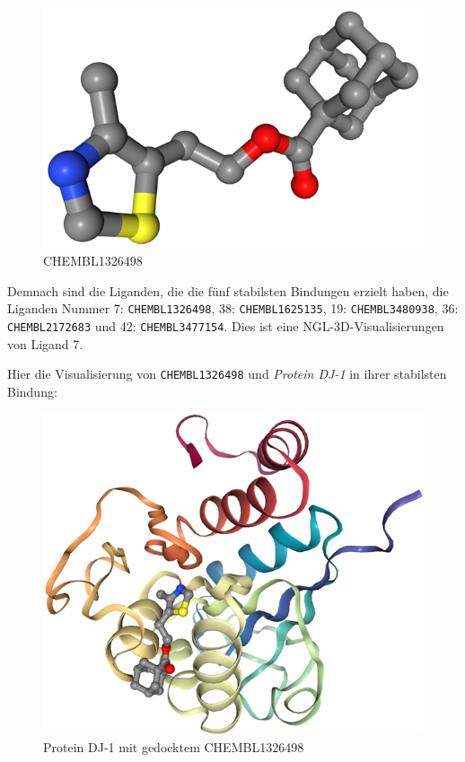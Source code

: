 \documentclass[10pt]{article}
\begin{document}
    \begin{figure}
        \includegraphics[width=\linewidth]{CHEMBL1326498}
        \caption{CHEMBL1326498}\label{fig:figure-CHEMBL1326498}
    \end{figure}

    Demnach sind die Liganden, die die fünf stabilsten Bindungen erzielt haben, die Liganden Nummer
    7: \texttt{CHEMBL1326498},
    38: \texttt{CHEMBL1625135}, 19: \texttt{CHEMBL3480938}, 36: \texttt{CHEMBL2172683} und 42: \texttt{CHEMBL3477154}.
    Dies ist eine NGL-3D-Visualisierungen von Ligand 7.



    Hier die Visualisierung von \texttt{CHEMBL1326498} und \emph{Protein DJ-1} in ihrer stabilsten Bindung:

    \begin{figure}[H]
        \centering
        \includegraphics[width=0.6\linewidth]{Protein DJ-1 mit gedocktem CHEMBL1326498}
        \caption{Protein DJ-1 mit gedocktem CHEMBL1326498}\label{fig:figure-pf-CHEMBL1326498}
    \end{figure}
\end{document}
